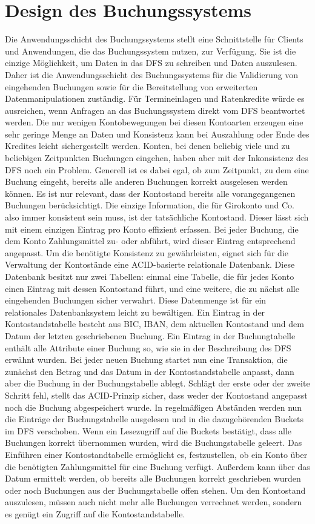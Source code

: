 \documentclass[12pt,oneside,a4paper,parskip]{scrbook}
\begin{document}
\section{Design des Buchungssystems}
Die Anwendungsschicht des Buchungssystems stellt eine Schnittstelle für Clients und Anwendungen, die das Buchungssystem nutzen, zur Verfügung. Sie ist die einzige Mög\-lich\-keit, um Daten in das DFS zu schreiben und Daten auszulesen. Daher ist die Anwendungsschicht des Buchungssystems für die Validierung von eingehenden Buchungen sowie für die Bereitstellung von erweiterten Datenmanipulationen zuständig. Für Termineinlagen und Ratenkredite würde es ausreichen, wenn Anfragen an das Buchungssystem direkt vom DFS beantwortet werden. Die nur wenigen Kontobewegungen bei diesen Kontoarten erzeugen eine sehr geringe Menge an Daten und Konsistenz kann bei Auszahlung oder Ende des Kredites leicht sichergestellt werden. Konten, bei denen beliebig viele und zu beliebigen Zeitpunkten Buchungen eingehen, haben aber mit der Inkonsistenz des DFS noch ein Problem. Generell ist es dabei egal, ob zum Zeitpunkt, zu dem eine Buchung eingeht, bereits alle anderen Buchungen korrekt ausgelesen werden können. Es ist nur relevant, dass der Kontostand bereits alle vorangegangenen Buchungen berücksichtigt. Die einzige Information, die für Girokonto und Co. also immer konsistent sein muss, ist der tatsächliche Kontostand. Dieser lässt sich mit einem einzigen Eintrag pro Konto effizient erfassen. Bei jeder Buchung, die dem Konto Zahlungsmittel zu- oder abführt, wird dieser Eintrag entsprechend angepasst. Um die benötigte Konsistenz zu gewährleisten, eignet sich für die Verwaltung der Kontostände eine ACID-basierte relationale Datenbank. Diese Datenbank besitzt nur zwei Tabellen: einmal eine Tabelle, die für jedes Konto einen Eintrag mit dessen Kontostand führt, und eine weitere, die zu nächst alle eingehenden Buchungen sicher verwahrt. Diese Datenmenge ist für ein relationales Datenbanksystem leicht zu bewältigen. Ein Eintrag in der Kontostandstabelle besteht aus BIC, IBAN, dem aktuellen Kontostand und dem Datum der letzten geschriebenen Buchung. Ein Eintrag in der Buchungtabelle enthält alle Attribute einer Buchung so, wie sie in der Beschreibung des DFS erwähnt wurden. Bei jeder neuen Buchung startet nun eine Transaktion, die zunächst den Betrag und das Datum in der Kontostandstabelle anpasst, dann aber die Buchung in der Buchungstabelle ablegt. Schlägt der erste oder der zweite Schritt fehl, stellt das ACID-Prinzip sicher, dass weder der Kontostand angepasst noch die Buchung abgespeichert wurde. In regelmäßigen Abständen werden nun die Einträge der Buchungstabelle ausgelesen und in die dazugehörenden Buckets im DFS verschoben. Wenn ein Lesezugriff auf die Buckets bestätigt, dass alle Buchungen korrekt übernommen wurden, wird die Buchungstabelle geleert. Das Einführen einer Kontostandtabelle ermöglicht es, festzustellen, ob ein Konto über die benötigten Zahlungsmittel für eine Buchung verfügt. Außerdem kann über das Datum ermittelt werden, ob bereits alle Buchungen korrekt geschrieben wurden oder noch Buchungen aus der Buchungstabelle offen stehen. Um den Kontostand auszulesen, müssen auch nicht mehr alle Buchungen verrechnet werden, sondern es genügt ein Zugriff auf die Kontostandstabelle.
\end{document}
